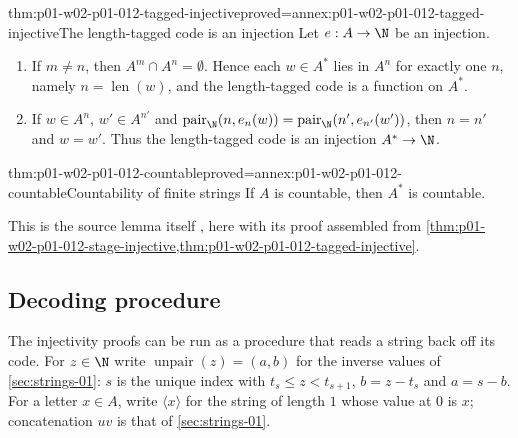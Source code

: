 \begin{hblemma}{thm:p01-w02-p01-012-tagged-injective}{proved=annex:p01-w02-p01-012-tagged-injective}{The length-tagged code is an injection}
Let \(e:A\to\N\) be an injection.
\begin{enumerate}
  \item If \(m\neq n\), then \(A^m\cap A^n=\emptyset\). Hence each
        \(w\in A^*\) lies in \(A^n\) for exactly one \(n\), namely
        \(n=\operatorname{len}(w)\), and the length-tagged code is a function
        on \(A^*\).
  \item If \(w\in A^n\), \(w'\in A^{n'}\) and
        \(\operatorname{pair}_{\N}(n,e_n(w))
          =\operatorname{pair}_{\N}(n',e_{n'}(w'))\), then \(n=n'\) and
        \(w=w'\). Thus the length-tagged code is an injection
        \(A^*\to\N\).
\end{enumerate}
\end{hblemma}

\begin{hbcorollary}{thm:p01-w02-p01-012-countable}{proved=annex:p01-w02-p01-012-countable}{Countability of finite strings}
If \(A\) is countable, then \(A^*\) is countable.
\end{hbcorollary}

This is the source lemma itself
\cite[ch.~``Finite Strings, Induction, and Recursion'', lemma
``Countability of finite strings'']{FrozenFormalLogicStringCoding}, here with
its proof assembled from
\cref{thm:p01-w02-p01-012-stage-injective,thm:p01-w02-p01-012-tagged-injective}.

\subsection{Decoding procedure}
\label{sec:p01-w02-p01-012-decoding-procedure}

The injectivity proofs can be run as a procedure that reads a string back off
its code. For \(z\in\N\) write \(\operatorname{unpair}(z)=(a,b)\) for the
inverse values of \cref{sec:strings-01}: \(s\) is the unique index with
\(t_s\leq z<t_{s+1}\), \(b=z-t_s\) and \(a=s-b\). For a letter \(x\in A\),
write \(\langle x\rangle\) for the string of length \(1\) whose value at
\(0\) is \(x\); concatenation \(uv\) is that of \cref{sec:strings-01}.

